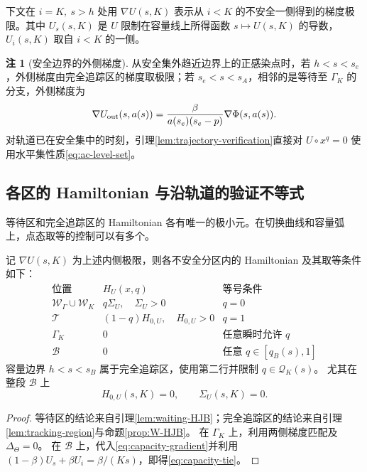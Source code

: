 \documentclass[lang=cn,a4paper,newtx]{elegantpaper}
\theoremstyle{plain}
\theoremstyle{definition}
\newtheorem{paperremark}[theorem]{注}
\begin{document}
下文在 $i=K,\ s>h$ 处用 $\nabla U(s,K)$ 表示从 $i<K$ 的不安全一侧得到的梯度极限。其中 $U_s(s,K)$ 是 $U$ 限制在容量线上所得函数 $s\mapsto U(s,K)$ 的导数，$U_i(s,K)$ 取自 $i<K$ 的一侧。

\begin{paperremark}[安全边界的外侧梯度]
\label{rem:safe-gradient}
从安全集外趋近边界上的正感染点时，若 $h<s<s_e$，外侧梯度由完全追踪区的梯度取极限；若 $s_e<s<s_A$，相邻的是等待至 $\Gamma_K$ 的分支，外侧梯度为
\[
\nabla U_{\rm out}(s,a(s))=
\frac{\beta}{a(s_e)(s_e-p)}\nabla\Phi(s,a(s)).
\]
对轨道已在安全集中的时刻，引理\ref{lem:trajectory-verification}直接对 $U\circ x^q=0$ 使用水平集性质\eqref{eq:ac-level-set}。
\end{paperremark}

\subsection{各区的 Hamiltonian 与沿轨道的验证不等式}
等待区和完全追踪区的 Hamiltonian 各有唯一的极小元。在切换曲线和容量弧上，点态取等的控制可以有多个。

\begin{proposition}
\label{prop:all-HJB}
记 $\nabla U(s,K)$ 为上述内侧极限，则各不安全分区内的 Hamiltonian 及其取等条件如下：
\begin{equation}
\begin{array}{c|c|c}
\text{位置}&H_U(x,q)&\text{等号条件}\\\hline
\mathcal W_\Gamma\cup\mathcal W_K&q\Sigma_U,\quad\Sigma_U>0&q=0\\
\mathcal T&(1-q)H_{0,U},\quad H_{0,U}>0&q=1\\
\Gamma_K&0&\text{任意瞬时允许 }q\\
\mathcal B&0&\text{任意 }q\in[q_B(s),1]
\end{array}
\label{eq:HJB-table}
\end{equation}
容量边界 $h<s<s_B$ 属于完全追踪区，使用第二行并限制 $q\in \mathcal Q_K(s)$。
尤其在整段 $\mathcal B$ 上
\begin{equation}
\boxed{H_{0,U}(s,K)=0,\qquad\Sigma_U(s,K)=0.}
\label{eq:capacity-tie}
\end{equation}
\end{proposition}
\begin{proof}
等待区的结论来自引理\ref{lem:waiting-HJB}；完全追踪区的结论来自引理\ref{lem:tracking-region}与命题\ref{prop:W-HJB}。
在 $\Gamma_K$ 上，利用两侧梯度匹配及 $\Delta_\Theta=0$。
在 $\mathcal B$ 上，代入\eqref{eq:capacity-gradient}并利用 $(1-\beta)U_s+\beta U_i=\beta/(Ks)$，即得\eqref{eq:capacity-tie}。
\end{proof}
\end{document}
